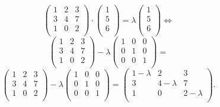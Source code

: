 \documentclass{scrartcl}
\begin{document}
\begin{equation}
	\begin{pmatrix*}
		1 & 2 & 3 \\
		3 & 4 & 7 \\
		1 & 0 & 2 \\
	\end{pmatrix*} \cdot \begin{pmatrix*}
		1 \\
		5 \\
		6 \\
	\end{pmatrix*} = \lambda \begin{pmatrix*}
		1 \\
		5 \\
		6 \\
	\end{pmatrix*} \Leftrightarrow
\end{equation}
\begin{equation}
	\begin{pmatrix*}
		1 & 2 & 3 \\
		3 & 4 & 7 \\
		1 & 0 & 2 \\
	\end{pmatrix*} - \lambda \begin{pmatrix*}
		1 & 0 & 0 \\
		0 & 1 & 0 \\
		0 & 0 & 1 \\
	\end{pmatrix*} = 
\end{equation}
\begin{equation}
	\begin{pmatrix*}
		1 & 2 & 3 \\
		3 & 4 & 7 \\
		1 & 0 & 2 \\
	\end{pmatrix*} - \lambda \begin{pmatrix*}
		1 & 0 & 0 \\
		0 & 1 & 0 \\
		0 & 0 & 1 \\
	\end{pmatrix*} = 
	\begin{pmatrix*}
		1 -\lambda	& 2		& 3		\\
		3		& 4 -\lambda	& 7		\\
		1		& 0		& 2 -\lambda	\\
	\end{pmatrix*}.
\end{equation}
\end{document}
